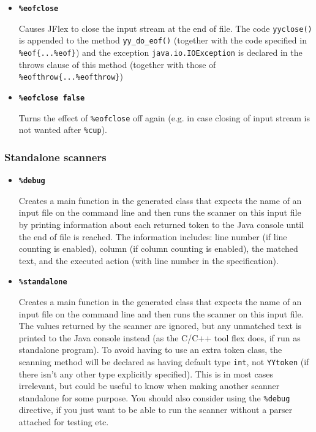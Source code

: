 \documentclass[11pt]{scrartcl}
\begin{document}
\begin{itemize}
\label{eofclose}
\item{\bfseries \texttt{\%eofclose}}
  
  Causes JFlex to close the input stream at the end of file. The code
  \texttt{yyclose()} is appended to the method \texttt{yy\_do\_eof()}
  (together with the code specified in \verb+%eof{...%eof}+) and
  the exception \texttt{java.io.IOException} is declared in the throws
  clause of this method (together with those of 
  \verb+%eofthrow{...%eofthrow}+)


\item{\bfseries \texttt{\%eofclose false}}
  
  Turns the effect of \texttt{\%eofclose} off again (e.g. in case closing of
  input stream is not wanted after \texttt{\%cup}).

\end{itemize}

\subsubsection{Standalone scanners}\label{Standalone}
\begin{itemize}
\item
{\bfseries \texttt{\%debug}}

Creates a main function in the generated class that expects the name
of an input file on the command line and then runs the scanner on this
input file by printing information about each returned token to the Java 
console until the end of file is reached. The information includes:
line number (if line counting is enabled), column (if column counting is enabled),
the matched text, and the executed action (with line number in the specification).
 
\item
{\bfseries \texttt{\%standalone}}

Creates a main function in the generated class that expects the name
of an input file on the command line and then runs the scanner on this
input file. The values returned by the scanner are ignored, but any unmatched
text is printed to the Java console instead (as the C/C++ tool flex does, if
run as standalone program). To avoid having to use an extra token class, the
scanning method will be declared as having default type \texttt{int}, not \texttt{YYtoken}
(if there isn't any other type explicitly specified).
This is in most cases irrelevant, but could be useful to know when making
another scanner standalone for some purpose. You should also consider using
the \texttt{\%debug} directive, if you just want to be able to run the scanner
without a parser attached for testing etc.

\end{itemize}
\end{document}
